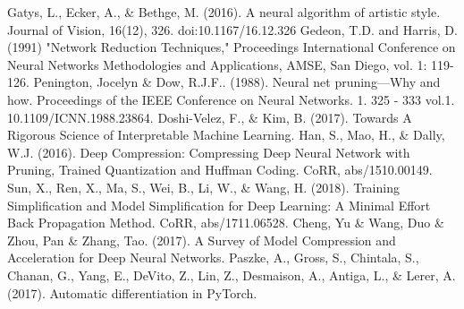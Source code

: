 \documentclass[runningheads]{llncs}
\begin{document}
\begin{thebibliography}{8}
Gatys, L., Ecker, A., \& Bethge, M. (2016). A neural algorithm of artistic style. Journal of Vision, 16(12), 326. doi:10.1167/16.12.326
Gedeon, T.D. and Harris, D. (1991) "Network Reduction Techniques," Proceedings International Conference on Neural Networks Methodologies and Applications, AMSE, San Diego, vol. 1: 119-126. 
Penington, Jocelyn \& Dow, R.J.F.. (1988). Neural net pruning—Why and how. Proceedings of the IEEE Conference on Neural Networks. 1. 325 - 333 vol.1. 10.1109/ICNN.1988.23864. 
Doshi-Velez, F., \& Kim, B. (2017). Towards A Rigorous Science of Interpretable Machine Learning.
Han, S., Mao, H., \& Dally, W.J. (2016). Deep Compression: Compressing Deep Neural Network with Pruning, Trained Quantization and Huffman Coding. CoRR, abs/1510.00149.
Sun, X., Ren, X., Ma, S., Wei, B., Li, W., \& Wang, H. (2018). Training Simplification and Model Simplification for Deep Learning: A Minimal Effort Back Propagation Method. CoRR, abs/1711.06528.
Cheng, Yu \& Wang, Duo \& Zhou, Pan \& Zhang, Tao. (2017). A Survey of Model Compression and Acceleration for Deep Neural Networks. 
Paszke, A., Gross, S., Chintala, S., Chanan, G., Yang, E., DeVito, Z., Lin, Z., Desmaison, A., Antiga, L., \& Lerer, A. (2017). Automatic differentiation in PyTorch.
\end{thebibliography}
\end{document}
